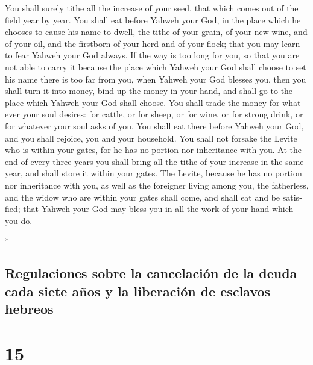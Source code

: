 \begin{paracol}{2}
\begin{otherlanguage}{english}
 You shall surely tithe all the increase of your seed,
that which comes out of the field year by year.  You
shall eat before Yahweh your God, in the place which he chooses to cause
his name to dwell, the tithe of your grain, of your new wine, and of
your oil, and the firstborn of your herd and of your flock; that you may
learn to fear Yahweh your God always.  If the way is too
long for you, so that you are not able to carry it because the place
which Yahweh your God shall choose to set his name there is too far from
you, when Yahweh your God blesses you,  then you shall
turn it into money, bind up the money in your hand, and shall go to the
place which Yahweh your God shall choose.  You shall
trade the money for whatever your soul desires: for cattle, or for
sheep, or for wine, or for strong drink, or for whatever your soul asks
of you. You shall eat there before Yahweh your God, and you shall
rejoice, you and your household.  You shall not forsake
the Levite who is within your gates, for he has no portion nor
inheritance with you.  At the end of every three years
you shall bring all the tithe of your increase in the same year, and
shall store it within your gates.  The Levite, because he
has no portion nor inheritance with you, as well as the foreigner living
among you, the fatherless, and the widow who are within your gates shall
come, and shall eat and be satisfied; that Yahweh your God may bless you
in all the work of your hand which you do.

\end{otherlanguage}

\switchcolumn[0]*

\hypertarget{regulaciones-sobre-la-cancelaciuxf3n-de-la-deuda-cada-siete-auxf1os-y-la-liberaciuxf3n-de-esclavos-hebreos}{%
\subsection{Regulaciones sobre la cancelación de la deuda cada siete
años y la liberación de esclavos
hebreos}\label{regulaciones-sobre-la-cancelaciuxf3n-de-la-deuda-cada-siete-auxf1os-y-la-liberaciuxf3n-de-esclavos-hebreos}}

\hypertarget{section-28}{%
\section{15}\label{section-28}}


\end{paracol}
